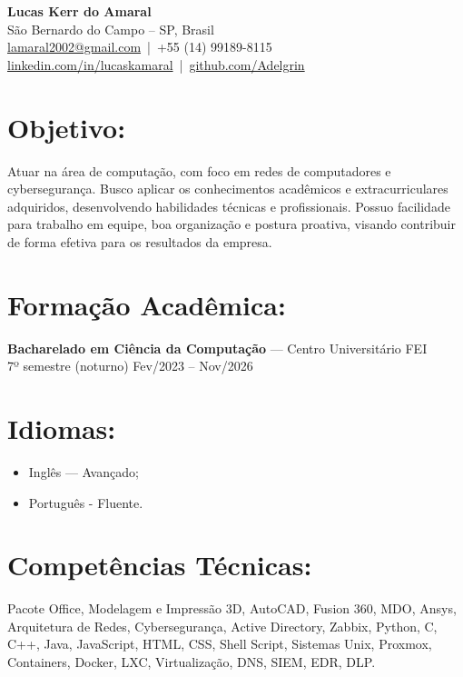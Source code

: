 \documentclass[11pt,a4paper]{article}
\begin{document}
\begin{center}
    {\LARGE \textbf{Lucas Kerr do Amaral}}\\[6pt]
    São Bernardo do Campo -- SP, Brasil\\
    \href{mailto:lamaral2002@gmail.com}{lamaral2002@gmail.com} \,|\, 
    +55 (14) 99189-8115\\
    \href{https://www.linkedin.com/in/lucaskamaral}{linkedin.com/in/lucaskamaral} \,|\, 
    \href{https://github.com/Adelgrin}{github.com/Adelgrin}
\end{center}

\section*{Objetivo:}

Atuar na área de computação, com foco em redes de computadores e cybersegurança. Busco aplicar os conhecimentos acadêmicos e extracurriculares adquiridos, desenvolvendo habilidades técnicas e profissionais. Possuo facilidade para trabalho em equipe, boa organização e postura proativa, visando contribuir de forma efetiva para os resultados da empresa.

\section*{Formação Acadêmica:}

\textbf{Bacharelado em Ciência da Computação} — Centro Universitário FEI\\
7º semestre (noturno) \hfill Fev/2023 -- Nov/2026

\section*{Idiomas:}

\begin{itemize}
	\item Inglês — Avançado;
	\item Português - Fluente.
\end{itemize}

\section*{Competências Técnicas:}

Pacote Office, Modelagem e Impressão 3D, AutoCAD, Fusion 360, MDO, Ansys,
Arquitetura de Redes, Cybersegurança, Active Directory, Zabbix, Python, C, C++, Java, 
JavaScript, HTML, CSS, Shell Script, Sistemas Unix, Proxmox, Containers, Docker, LXC, 
Virtualização, DNS, SIEM, EDR, DLP.
\end{document}
